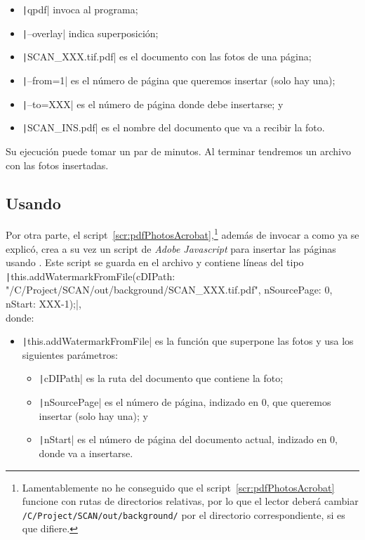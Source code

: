 \documentclass[%
	a5paper,
	10pt,
	twoside,
	openright,
	final,
]{memoir}
\begin{document}
	\begin{itemize}[noitemsep]
		\item \texttt|qpdf| invoca al programa;
		\item \texttt|--overlay| indica superposición;
		\item \texttt|SCAN_XXX.tif.pdf| es el documento con las fotos de una página;
		\item \texttt|--from=1| es el número de página que queremos insertar (solo hay una);
		\item \texttt|--to=XXX| es el número de página donde debe insertarse; y
		\item \texttt|SCAN_INS.pdf| es el nombre del documento que va a recibir la foto.
	\end{itemize}



	Su ejecución puede tomar un par de minutos. Al terminar tendremos un archivo  con las fotos insertadas.

	\subsection{Usando \acrobat\label{sec:pdfPhotosAcrobat}} Por otra parte, el script~\ref{scr:pdfPhotosAcrobat},\footnote{Lamentablemente no he conseguido que el script~\ref{scr:pdfPhotosAcrobat} funcione con rutas de directorios relativas, por lo que el lector deberá cambiar \texttt{/C/Project/SCAN/out/background/} por el directorio correspondiente, si es que difiere.} además de invocar a \imagemagick como ya se explicó, crea a su vez un script de \emph{Adobe Javascript} para insertar las páginas usando \acrobat \cite{AdobeJavaScriptGuide, AdobeJavaScriptReference}. Este script se guarda en el archivo  y contiene líneas del tipo \texttt|this.addWatermarkFromFile({cDIPath: "/C/Project/SCAN/out/background/SCAN_XXX.tif.pdf", nSourcePage: 0, nStart: XXX-1});|,\\donde:

	\begin{itemize}[noitemsep]
		\item \texttt|this.addWatermarkFromFile| es la función que superpone las fotos y usa los siguientes parámetros:
		\begin{itemize}[noitemsep]
			\item \texttt|cDIPath| es la ruta del documento que contiene la foto;
			\item \texttt|nSourcePage| es el número de página, indizado en 0, que queremos insertar (solo hay una); y
			\item \texttt|nStart| es el número de página del documento actual, indizado en 0, donde va a insertarse.
		\end{itemize}
	\end{itemize}
\end{document}
